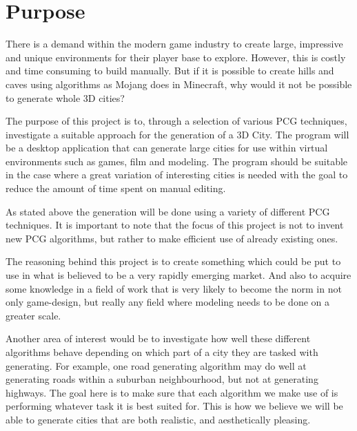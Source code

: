 \section{Purpose}
There is a demand within the modern game industry to create large, impressive and unique environments for their player base to explore.
However, this is costly and time consuming to build manually.
But if it is possible to create hills and caves using algorithms as Mojang does in Minecraft, why would it not be possible to generate whole 3D cities?

The purpose of this project is to, through a selection of various PCG techniques, investigate a suitable approach for the generation of a 3D City.
The program will be a desktop application that can generate large cities for use within virtual environments such as games, film and modeling.
The program should be suitable in the case where a great variation of interesting cities is needed with the goal to reduce the amount of time spent on manual editing.

As stated above the generation will be done using a variety of different PCG techniques. It is important to note that the focus of this project is not to invent new PCG algorithms, but rather to make efficient use of already existing ones. 

The reasoning behind this project is to create something which could be put to use in what is believed to be a very rapidly emerging market. And also to acquire some knowledge in a field of work that is very likely to become the norm in not only game-design, but really any field where modeling needs to be done on a greater scale. 

Another area of interest would be to investigate how well these different algorithms behave
depending on which part of a city they are tasked with generating. For example, one road generating algorithm may do well at generating roads within a suburban neighbourhood, but not at generating highways. The goal here is to make sure that each algorithm we make use of is performing whatever task it is best suited for. This is how we believe we will be able to generate cities that are both realistic, and aesthetically pleasing. 

